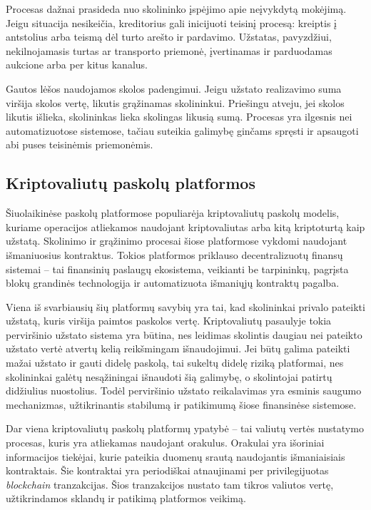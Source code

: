 \documentclass[]{VUMIFTemplateClass}
\begin{document}
Procesas dažnai prasideda nuo skolininko įspėjimo apie neįvykdytą mokėjimą. Jeigu situacija nesikeičia, kreditorius gali inicijuoti teisinį procesą: kreiptis į antstolius arba teismą dėl turto arešto ir pardavimo. Užstatas, pavyzdžiui, nekilnojamasis turtas ar transporto priemonė, įvertinamas ir parduodamas aukcione arba per kitus kanalus.

Gautos lėšos naudojamos skolos padengimui. Jeigu užstato realizavimo suma viršija skolos vertę, likutis grąžinamas skolininkui. Priešingu atveju, jei skolos likutis išlieka, skolininkas lieka skolingas likusią sumą. Procesas yra ilgesnis nei automatizuotose sistemose, tačiau suteikia galimybę ginčams spręsti ir apsaugoti abi puses teisinėmis priemonėmis.

\subsection{Kriptovaliutų paskolų platformos}
Šiuolaikinėse paskolų platformose populiarėja kriptovaliutų paskolų modelis, kuriame operacijos atliekamos naudojant kriptovaliutas arba kitą kriptoturtą kaip užstatą. Skolinimo ir grąžinimo procesai šiose platformose vykdomi naudojant išmaniuosius kontraktus. Tokios platformos priklauso decentralizuotų finansų sistemai – tai finansinių paslaugų ekosistema, veikianti be tarpininkų, pagrįsta blokų grandinės technologija ir automatizuota išmaniųjų kontraktų pagalba.

Viena iš svarbiausių šių platformų savybių yra tai, kad skolininkai privalo pateikti užstatą, kuris viršija paimtos paskolos vertę. Kriptovaliutų pasaulyje tokia perviršinio užstato sistema yra būtina, nes leidimas skolintis daugiau nei pateikto užstato vertė atvertų kelią reikšmingam išnaudojimui. Jei būtų galima pateikti mažai užstato ir gauti didelę paskolą, tai sukeltų didelę riziką platformai, nes skolininkai galėtų nesąžiningai išnaudoti šią galimybę, o skolintojai patirtų didžiulius nuostolius. Todėl perviršinio užstato reikalavimas yra esminis saugumo mechanizmas, užtikrinantis stabilumą ir patikimumą šiose finansinėse sistemose. \cite{whatisdefiliquidation}

Dar viena kriptovaliutų paskolų platformų ypatybė -- tai valiutų vertės nustatymo procesas, kuris yra atliekamas naudojant orakulus. Orakulai yra išoriniai informacijos tiekėjai, kurie pateikia duomenų srautą naudojantis išmaniaisiais kontraktais. Šie kontraktai yra periodiškai atnaujinami per privilegijuotas \textit{blockchain} tranzakcijas. Šios tranzakcijos nustato tam tikros valiutos vertę, užtikrindamos sklandų ir patikimą platformos veikimą.
\end{document}
